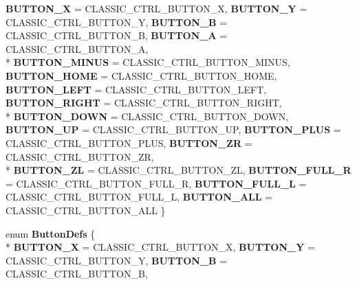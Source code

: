 \begin{DoxyCompactItemize}
{\bfseries B\-U\-T\-T\-O\-N\-\_\-\-X} =  C\-L\-A\-S\-S\-I\-C\-\_\-\-C\-T\-R\-L\-\_\-\-B\-U\-T\-T\-O\-N\-\_\-\-X, 
{\bfseries B\-U\-T\-T\-O\-N\-\_\-\-Y} =  C\-L\-A\-S\-S\-I\-C\-\_\-\-C\-T\-R\-L\-\_\-\-B\-U\-T\-T\-O\-N\-\_\-\-Y, 
{\bfseries B\-U\-T\-T\-O\-N\-\_\-\-B} =  C\-L\-A\-S\-S\-I\-C\-\_\-\-C\-T\-R\-L\-\_\-\-B\-U\-T\-T\-O\-N\-\_\-\-B, 
{\bfseries B\-U\-T\-T\-O\-N\-\_\-\-A} =  C\-L\-A\-S\-S\-I\-C\-\_\-\-C\-T\-R\-L\-\_\-\-B\-U\-T\-T\-O\-N\-\_\-\-A, 
\\*
{\bfseries B\-U\-T\-T\-O\-N\-\_\-\-M\-I\-N\-U\-S} =  C\-L\-A\-S\-S\-I\-C\-\_\-\-C\-T\-R\-L\-\_\-\-B\-U\-T\-T\-O\-N\-\_\-\-M\-I\-N\-U\-S, 
{\bfseries B\-U\-T\-T\-O\-N\-\_\-\-H\-O\-M\-E} =  C\-L\-A\-S\-S\-I\-C\-\_\-\-C\-T\-R\-L\-\_\-\-B\-U\-T\-T\-O\-N\-\_\-\-H\-O\-M\-E, 
{\bfseries B\-U\-T\-T\-O\-N\-\_\-\-L\-E\-F\-T} =  C\-L\-A\-S\-S\-I\-C\-\_\-\-C\-T\-R\-L\-\_\-\-B\-U\-T\-T\-O\-N\-\_\-\-L\-E\-F\-T, 
{\bfseries B\-U\-T\-T\-O\-N\-\_\-\-R\-I\-G\-H\-T} =  C\-L\-A\-S\-S\-I\-C\-\_\-\-C\-T\-R\-L\-\_\-\-B\-U\-T\-T\-O\-N\-\_\-\-R\-I\-G\-H\-T, 
\\*
{\bfseries B\-U\-T\-T\-O\-N\-\_\-\-D\-O\-W\-N} =  C\-L\-A\-S\-S\-I\-C\-\_\-\-C\-T\-R\-L\-\_\-\-B\-U\-T\-T\-O\-N\-\_\-\-D\-O\-W\-N, 
{\bfseries B\-U\-T\-T\-O\-N\-\_\-\-U\-P} =  C\-L\-A\-S\-S\-I\-C\-\_\-\-C\-T\-R\-L\-\_\-\-B\-U\-T\-T\-O\-N\-\_\-\-U\-P, 
{\bfseries B\-U\-T\-T\-O\-N\-\_\-\-P\-L\-U\-S} =  C\-L\-A\-S\-S\-I\-C\-\_\-\-C\-T\-R\-L\-\_\-\-B\-U\-T\-T\-O\-N\-\_\-\-P\-L\-U\-S, 
{\bfseries B\-U\-T\-T\-O\-N\-\_\-\-Z\-R} =  C\-L\-A\-S\-S\-I\-C\-\_\-\-C\-T\-R\-L\-\_\-\-B\-U\-T\-T\-O\-N\-\_\-\-Z\-R, 
\\*
{\bfseries B\-U\-T\-T\-O\-N\-\_\-\-Z\-L} =  C\-L\-A\-S\-S\-I\-C\-\_\-\-C\-T\-R\-L\-\_\-\-B\-U\-T\-T\-O\-N\-\_\-\-Z\-L, 
{\bfseries B\-U\-T\-T\-O\-N\-\_\-\-F\-U\-L\-L\-\_\-\-R} =  C\-L\-A\-S\-S\-I\-C\-\_\-\-C\-T\-R\-L\-\_\-\-B\-U\-T\-T\-O\-N\-\_\-\-F\-U\-L\-L\-\_\-\-R, 
{\bfseries B\-U\-T\-T\-O\-N\-\_\-\-F\-U\-L\-L\-\_\-\-L} =  C\-L\-A\-S\-S\-I\-C\-\_\-\-C\-T\-R\-L\-\_\-\-B\-U\-T\-T\-O\-N\-\_\-\-F\-U\-L\-L\-\_\-\-L, 
{\bfseries B\-U\-T\-T\-O\-N\-\_\-\-A\-L\-L} =  C\-L\-A\-S\-S\-I\-C\-\_\-\-C\-T\-R\-L\-\_\-\-B\-U\-T\-T\-O\-N\-\_\-\-A\-L\-L
 \}
\item 
enum {\bfseries Button\-Defs} \{ \\*
{\bfseries B\-U\-T\-T\-O\-N\-\_\-\-X} =  C\-L\-A\-S\-S\-I\-C\-\_\-\-C\-T\-R\-L\-\_\-\-B\-U\-T\-T\-O\-N\-\_\-\-X, 
{\bfseries B\-U\-T\-T\-O\-N\-\_\-\-Y} =  C\-L\-A\-S\-S\-I\-C\-\_\-\-C\-T\-R\-L\-\_\-\-B\-U\-T\-T\-O\-N\-\_\-\-Y, 
{\bfseries B\-U\-T\-T\-O\-N\-\_\-\-B} =  C\-L\-A\-S\-S\-I\-C\-\_\-\-C\-T\-R\-L\-\_\-\-B\-U\-T\-T\-O\-N\-\_\-\-B, 

\end{DoxyCompactItemize}
